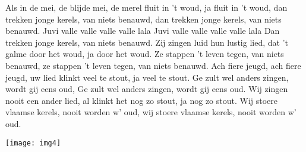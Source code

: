 \beginverse
Als in de mei, de blijde mei,
de merel fluit in 't woud,
ja fluit in 't woud,
dan trekken jonge kerels, 
van niets benauwd,
dan trekken jonge kerels, 
van niets benauwd.
\endverse
\beginchorus
Juvi valle valle valle valle lala
Juvi valle valle valle valle lala
Dan trekken jonge kerels, 
van niets benauwd.
\endchorus
\beginverse
Zij zingen luid hun lustig lied,
dat 't galme door het woud, 
ja door het woud.
Ze stappen 't leven tegen, 
van niets benauwd,
ze stappen 't leven tegen, 
van niets benauwd.
\endverse
\beginverse
Ach fiere jeugd, ach fiere jeugd,
uw lied klinkt veel te stout, 
ja veel te stout.
Ge zult wel anders zingen,
wordt gij eens oud,
Ge zult wel anders zingen,
wordt gij eens oud.
\endverse
\beginverse
Wij zingen nooit een ander lied,
al klinkt het nog zo stout,
ja nog zo stout.
Wij stoere vlaamse kerels, 
nooit worden w' oud,
wij stoere vlaamse kerels, 
nooit worden w' oud.
\endverse
\endsong
\begin{intersong}
    \texttt{[image: img4]}
\end{intersong}